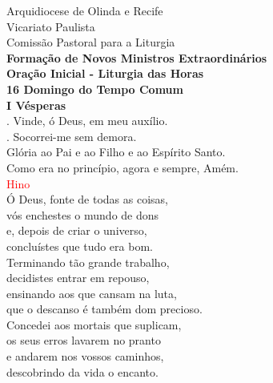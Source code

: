 \documentclass{book}
\begin{document}
\pagestyle{empty}
\begin{center}
    Arquidiocese de Olinda e Recife \\
    Vicariato Paulista \\
    Comissão Pastoral para a Liturgia
    \vspace{.2cm} \\
    \textbf{Formação de Novos Ministros Extraordinários}
    \vspace{.2cm} \\
    \textbf{Oração Inicial - Liturgia das Horas}
    \vspace{.2cm} \\
    \textbf{16\textordmasculine{} Domingo do Tempo Comum}
    \vspace{.2cm} \\
    \textbf{I Vésperas}
    \vspace{.2cm} \\
    {\color{red} \Vbar.} Vinde, ó Deus, em meu auxílio. \\
    {\color{red} \Rbar.} Socorrei-me sem demora. \\
    Glória ao Pai e ao Filho e ao Espírito Santo. \\
    Como era no princípio, agora e sempre, Amém.
    \vspace{.2cm} \\
    \textcolor{red}{Hino}
    \vspace{.2cm} \\
    Ó Deus, fonte de todas as coisas, \\
    vós enchestes o mundo de dons \\
    e, depois de criar o universo, \\
    concluístes que tudo era bom.
    \vspace{.2cm} \\
    Terminando tão grande trabalho, \\
    decidistes entrar em repouso, \\
    ensinando aos que cansam na luta, \\
    que o descanso é também dom precioso.
    \vspace{.2cm} \\
    Concedei aos mortais que suplicam, \\
    os seus erros lavarem no pranto \\
    e andarem nos vossos caminhos, \\
    descobrindo da vida o encanto.
    \vspace{.2cm} \\

\end{center}
\end{document}
